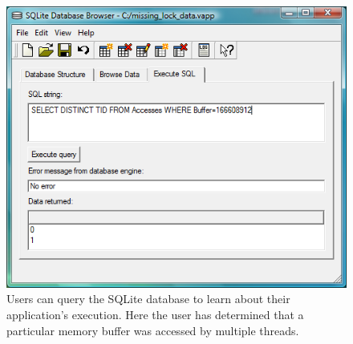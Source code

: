 \begin{figure}
  \includegraphics[width=\columnwidth]{sqlite_query}
  \caption{Users can query the SQLite database to learn
  	about their application's execution.  Here the user
  	has determined that a particular memory buffer was
  	accessed by multiple threads.}
  \label{pic:sqlite_query}
\end{figure}



